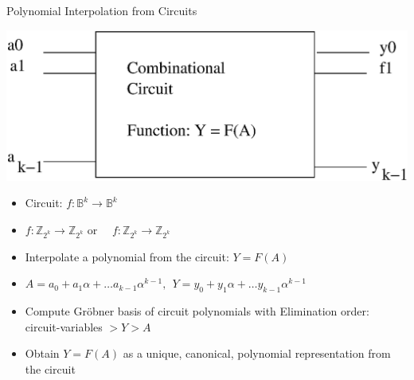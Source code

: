 \documentclass[xcolor=dvipsnames]{beamer}
\newcommand{\Zkk}{{\mathbb{Z}}_{2^k}}
\begin{document}


\begin{frame}{\large Polynomial Interpolation from Circuits}

\centerline{
\includegraphics[scale=0.4]{interp.eps}
}


\begin{itemize}
\item Circuit: $f: \mathbb{B}^{k} \rightarrow \mathbb{B}^k$
\item $f: \Zkk \rightarrow \Zkk$ or ~~$f: \Zkk \rightarrow \Zkk$
\item Interpolate a polynomial from the circuit: $Y = F(A)$
\item $A = a_0 + a_1\alpha + \dots a_{k-1}\alpha^{k-1}, ~~Y = y_0 +
  y_1\alpha + \dots y_{k-1}\alpha^{k-1}$ 
\item Compute Gr\"obner basis of circuit polynomials with Elimination order:
  circuit-variables $> Y > A$
\item Obtain $Y = F(A)$ as a \alert{unique, canonical, polynomial}
  representation from the circuit
  
\end{itemize}




\end{frame}
\end{document}
